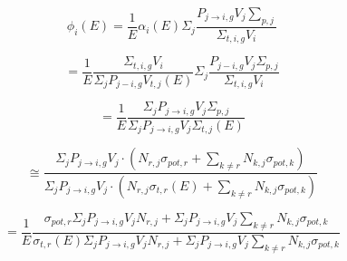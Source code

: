 \documentclass[10pt]{article}
\begin{document}






\begin{equation}\phi_{i}(E)=\frac{1}{E}\alpha_{i}(E)\Sigma_j\frac{P_{j\rightarrow i,g}V_{j}\sum\limits_{p,j}}{\Sigma_{t,i,g}V_{i}}\end{equation}

\begin{equation}=\frac{1}{E}\frac{\Sigma_{t,i,g}V_{i}}{\Sigma_jP_{j-i,g}V_{t,j}(E)}\Sigma_j\frac{P_{j-i,g}V_{j}\Sigma_{p,j}}{\Sigma_{t,i,g}V_{i}}\end{equation}

\begin{equation}=\frac{1}{E}\frac{\Sigma_jP_{j\rightarrow i,g}V_{j}\Sigma_{p,j}}{\Sigma_jP_{j\rightarrow i,g}V_{j}\Sigma_{t,j}(E)}\end{equation}

\begin{equation}\cong\frac{\Sigma_jP_{j\rightarrow i,g}V_{j}\cdot\left(N_{r,j}\sigma_{pot,r}+\sum\limits_{k\neq r}N_{k,j}\sigma_{pot,k}\right)}{\Sigma_jP_{j\rightarrow i,g}V_{j}\cdot\left(N_{r,j}\sigma_{t,r}(E)+\sum\limits_{k\neq r}N_{k,j}\sigma_{pot,k}\right)}\end{equation}

\begin{equation}=\frac{1}{E}\frac{\sigma_{pot,r}\Sigma_jP_{j\rightarrow i,g}V_{j}N_{r,j}+\Sigma_jP_{j\rightarrow i,g}V_{j}\sum\limits_{k\neq r}N_{k,j}\sigma_{pot,k}}{\sigma_{t,r}(E)\Sigma_jP_{j\rightarrow i,g}V_{j}N_{r,j}+\Sigma_jP_{j\rightarrow i,g}V_{j}\sum\limits_{k\neq r}N_{k,j}\sigma_{pot,k}}\end{equation}
\end{document}
